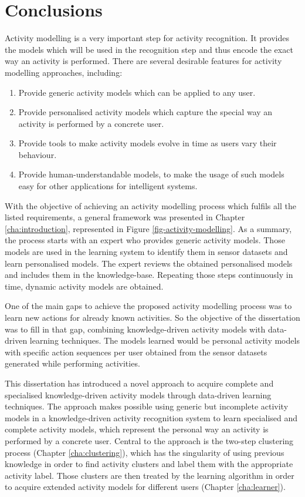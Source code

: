 \section{Conclusions}
\label{sec:conclusions:conclusions}

Activity modelling is a very important step for activity recognition. It provides the models which will be used in the recognition step and thus encode the exact way an activity is performed. There are several desirable features for activity modelling approaches, including:

\begin{enumerate}
 \item Provide generic activity models which can be applied to any user.
 \item Provide personalised activity models which capture the special way an activity is performed by a concrete user.
 \item Provide tools to make activity models evolve in time as users vary their behaviour.
 \item Provide human-understandable models, to make the usage of such models easy for other applications for intelligent systems.
\end{enumerate}

With the objective of achieving an activity modelling process which fulfils all the listed requirements, a general framework was presented in Chapter \ref{cha:introduction}, represented in Figure \ref{fig-activity-modelling}. As a summary, the process starts with an expert who provides generic activity models. Those models are used in the learning system to identify them in sensor datasets and learn personalised models. The expert reviews the obtained personalised models and includes them in the knowledge-base. Repeating those steps continuously in time, dynamic activity models are obtained.

One of the main gaps to achieve the proposed activity modelling process was to learn new actions for already known activities. So the objective of the dissertation was to fill in that gap, combining knowledge-driven activity models with data-driven learning techniques. The models learned would be personal activity models with specific action sequences per user obtained from the sensor datasets generated while performing activities.

This dissertation has introduced a novel approach to acquire complete and specialised knowledge-driven activity models through data-driven learning techniques. The approach makes possible using generic but incomplete activity models in a knowledge-driven activity recognition system to learn specialised and complete activity models, which represent the personal way an activity is performed by a concrete user. Central to the approach is the two-step clustering process (Chapter \ref{cha:clustering}), which has the singularity of using previous knowledge in order to find activity clusters and label them with the appropriate activity label. Those clusters are then treated by the learning algorithm in order to acquire extended activity models for different users (Chapter \ref{cha:learner}).

